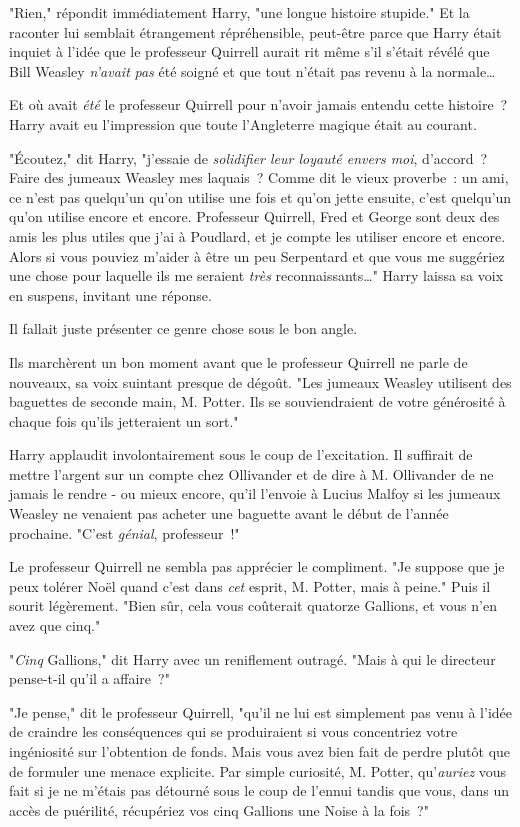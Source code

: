 "Rien," répondit immédiatement Harry, "une longue histoire stupide." Et la raconter lui semblait étrangement répréhensible, peut-être parce que Harry était inquiet à l'idée que le professeur Quirrell aurait rit même s'il s'était révélé que Bill Weasley \emph{n'avait} \emph{pas} été soigné et que tout n'était pas revenu à la normale…

Et où avait \emph{été} le professeur Quirrell pour n'avoir jamais entendu cette histoire~? Harry avait eu l'impression que toute l'Angleterre magique était au courant.

"Écoutez," dit Harry, "j'essaie de \emph{solidifier leur loyauté envers moi}, d'accord~? Faire des jumeaux Weasley mes laquais~? Comme dit le vieux proverbe~: un ami, ce n'est pas quelqu'un qu'on utilise une fois et qu'on jette ensuite, c'est quelqu'un qu'on utilise encore et encore. Professeur Quirrell, Fred et George sont deux des amis les plus utiles que j'ai à Poudlard, et je compte les utiliser encore et encore. Alors si vous pouviez m'aider à être un peu Serpentard et que vous me suggériez une chose pour laquelle ils me seraient \emph{très} reconnaissants…" Harry laissa sa voix en suspens, invitant une réponse.

Il fallait juste présenter ce genre chose sous le bon angle.

Ils marchèrent un bon moment avant que le professeur Quirrell ne parle de nouveaux, sa voix suintant presque de dégoût. "Les jumeaux Weasley utilisent des baguettes de seconde main, M. Potter. Ils se souviendraient de votre générosité à chaque fois qu'ils jetteraient un sort."

Harry applaudit involontairement sous le coup de l'excitation. Il suffirait de mettre l'argent sur un compte chez Ollivander et de dire à M. Ollivander de ne jamais le rendre - ou mieux encore, qu'il l'envoie à Lucius Malfoy si les jumeaux Weasley ne venaient pas acheter une baguette avant le début de l'année prochaine. "C'est \emph{génial}, professeur~!"

Le professeur Quirrell ne sembla pas apprécier le compliment. "Je suppose que je peux tolérer Noël quand c'est dans \emph{cet} esprit, M. Potter, mais à peine." Puis il sourit légèrement. "Bien sûr, cela vous coûterait quatorze Gallions, et vous n'en avez que cinq."

"\emph{Cinq} Gallions," dit Harry avec un reniflement outragé. "Mais à qui le directeur pense-t-il qu'il a affaire~?"

"Je pense," dit le professeur Quirrell, "qu'il ne lui est simplement pas venu à l'idée de craindre les conséquences qui se produiraient si vous concentriez votre ingéniosité sur l'obtention de fonds. Mais vous avez bien fait de perdre plutôt que de formuler une menace explicite. Par simple curiosité, M. Potter, qu'\emph{auriez} vous fait si je ne m'étais pas détourné sous le coup de l'ennui tandis que vous, dans un accès de puérilité, récupériez vos cinq Gallions une Noise à la fois~?"

